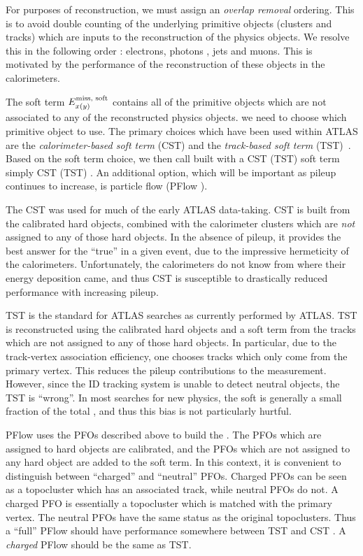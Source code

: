 For purposes of \met reconstruction, we must assign an \textit{overlap removal} ordering.
This is to avoid double counting of the underlying primitive objects (clusters and tracks) which are inputs to the reconstruction of the physics objects.
We resolve this in the following order : electrons, photons , jets and muons.
This is motivated by the performance of the reconstruction of these objects in the calorimeters.

The soft term $\Emisscomp{x(y)}{\text{soft}}$ contains all of the primitive objects which are not associated to any of the reconstructed physics objects.
we need to choose which primitive object to use.
The primary choices which have been used within ATLAS are the \textit{ calorimeter-based soft term} (CST) and the \textit{track-based soft term} (TST)~\cite{Aad:2016nrq}.
Based on the soft term choice, we then call \met built with a CST (TST) soft term simply CST (TST) \met.
An additional option, which will be important as pileup continues to increase, is particle flow \met (PFlow \met).

The CST \met was used for much of the early ATLAS data-taking.
CST \met is built from the calibrated hard objects, combined with the calorimeter clusters which are \textit{not} assigned to any of those hard objects.
In the absence of pileup, it provides the best answer for the ``true'' \met in a given event, due to the impressive hermeticity of the calorimeters.
Unfortunately, the calorimeters do not know from where their energy deposition came, and thus CST is susceptible to drastically reduced performance with increasing pileup.

TST \met is the standard for ATLAS searches as currently performed by ATLAS.
TST \met is reconstructed using the calibrated hard objects and a soft term from the tracks which are not assigned to any of those hard objects.
In particular, due to the track-vertex association efficiency, one chooses tracks which only come from the primary vertex.
This reduces the pileup contributions to the \met measurement.
However, since the ID tracking system is unable to detect neutral objects, the TST \met is ``wrong''.
In most searches for new physics, the soft \met is generally a small fraction of the total \met, and thus this bias is not particularly hurtful.

PFlow \met uses the PFOs described above to build the \met.
The PFOs which are assigned to hard objects are calibrated, and the PFOs which are not assigned to any hard object are added to the soft term.
In this context, it is convenient to distinguish between ``charged'' and ``neutral'' PFOs.
Charged PFOs can be seen as a topocluster which has an associated track, while neutral PFOs do not.
A charged PFO is essentially a topocluster which is matched with the primary vertex.
The neutral PFOs have the same status as the original topoclusters.
Thus a ``full'' PFlow \met should have performance somewhere between TST \met and CST \met\footnotemark.
A \textit{charged} PFlow \met should be the same as TST.


